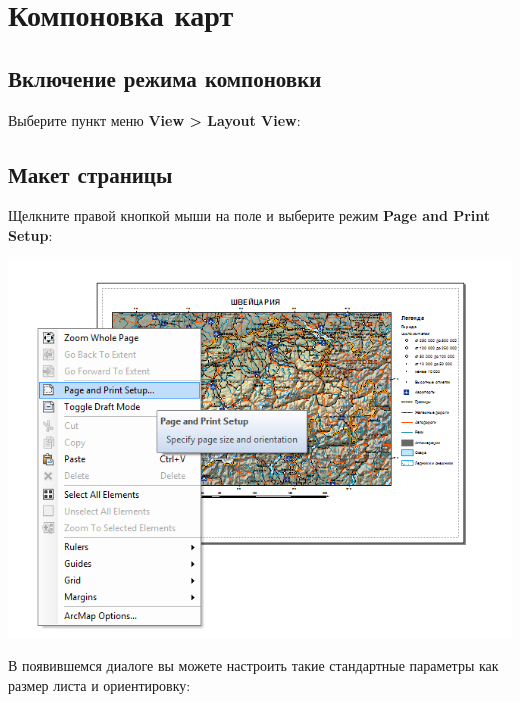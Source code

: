 \documentclass[]{book}
\theoremstyle{definition}
\theoremstyle{definition}
\theoremstyle{definition}
\theoremstyle{remark}
\begin{document}
\hypertarget{manual-layout}{%
\chapter{Компоновка карт}\label{manual-layout}}

\hypertarget{--}{%
\section{Включение режима компоновки}\label{--}}

Выберите пункт меню \textbf{View \textgreater{} Layout View}:

\hypertarget{-}{%
\section{Макет страницы}\label{-}}

Щелкните правой кнопкой мыши на поле и выберите режим \textbf{Page and
Print Setup}:

\includegraphics{images/Appendix/image51.png}

В появившемся диалоге вы можете настроить такие стандартные параметры
как размер листа и ориентировку:
\end{document}
